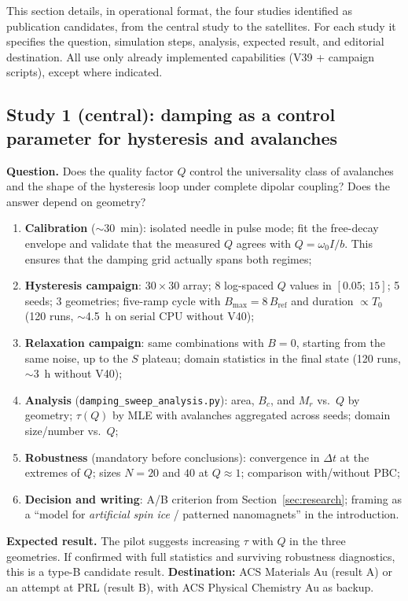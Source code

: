 \documentclass[11pt,a4paper]{article}
\newcommand{\code}[1]{\texttt{#1}}
\begin{document}
This section details, in operational format, the four studies identified as publication candidates, from the central study to the satellites. For each study it specifies the question, simulation steps, analysis, expected result, and editorial destination. All use only already implemented capabilities (V39 + campaign scripts), except where indicated.

\subsection{Study 1 (central): damping as a control parameter for hysteresis and avalanches}

\textbf{Question.} Does the quality factor $Q$ control the universality class of avalanches and the shape of the hysteresis loop under complete dipolar coupling? Does the answer depend on geometry?

\begin{enumerate}
\item \textbf{Calibration} ($\sim$30~min): isolated needle in pulse mode; fit the free-decay envelope and validate that the measured $Q$ agrees with $Q = \omega_0 I / b$. This ensures that the damping grid actually spans both regimes;
\item \textbf{Hysteresis campaign}: $30\times30$ array; 8 log-spaced $Q$ values in $[0.05;\,15]$; 5 seeds; 3 geometries; five-ramp cycle with $B_{\max} = 8\,B_{\mathrm{ref}}$ and duration $\propto T_0$ (120 runs, $\sim$4.5~h on serial CPU without V40);
\item \textbf{Relaxation campaign}: same combinations with $B = 0$, starting from the same noise, up to the $S$ plateau; domain statistics in the final state (120 runs, $\sim$3~h without V40);
\item \textbf{Analysis} (\code{damping\_sweep\_analysis.py}): area, $B_c$, and $M_r$ vs.\ $Q$ by geometry; $\tau(Q)$ by MLE with avalanches aggregated across seeds; domain size/number vs.\ $Q$;
\item \textbf{Robustness} (mandatory before conclusions): convergence in $\Delta t$ at the extremes of $Q$; sizes $N = 20$ and $40$ at $Q \approx 1$; comparison with/without PBC;
\item \textbf{Decision and writing}: A/B criterion from Section~\ref{sec:research}; framing as a ``model for \emph{artificial spin ice} / patterned nanomagnets'' in the introduction.
\end{enumerate}

\textbf{Expected result.} The pilot suggests increasing $\tau$ with $Q$ in the three geometries. If confirmed with full statistics and surviving robustness diagnostics, this is a type-B candidate result. \textbf{Destination:} ACS Materials Au (result A) or an attempt at PRL (result B), with ACS Physical Chemistry Au as backup.
\end{document}
